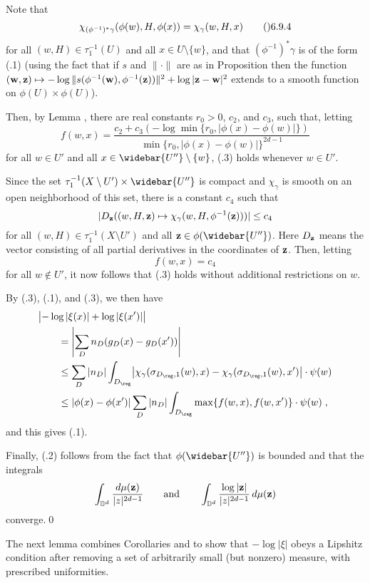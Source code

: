 Note that
$$\chi_{(\phi^{-1})^{*}\gamma}(\phi(w),H,\phi(x)) = \chi_\gamma(w,H,x)
  \tag\06.9.4$$
for all $(w,H)\in\tau_1^{-1}(U)$ and all $x\in U\setminus\{w\}$,
and that $(\phi^{-1})^{*}\gamma$ is of the form (.1) (using the fact that
if $s$ and $\|\cdot\|$ are as in Proposition  then
the function $(\bold w,\bold z) \mapsto
  -\log\|s(\phi^{-1}(\bold w),\phi^{-1}(\bold z))\|^2+\log|\bold z-\bold w|^2$
extends to a smooth function on $\phi(U)\times\phi(U)$).

Then, by Lemma , there are real constants $r_0>0$, $c_2$, and $c_3$,
such that, letting
$$f(w,x) = \frac{c_2+c_3(-\log\min\{r_0,|\phi(x)-\phi(w)|\})}
    {\min\{r_0,|\phi(x)-\phi(w)|\}^{2d-1}}$$
for all $w\in U'$ and all $x\in\widebar{U''}\setminus\{w\}$,
(.3) holds whenever $w\in U'$.

Since the set $\tau_1^{-1}(X\setminus U')\times\widebar{U''}$ is compact
and $\chi_\gamma$ is smooth on an open neighborhood of this set,
there is a constant $c_4$ such that
$$|D_{\bold z}((w,H,\bold z)\mapsto\chi_\gamma(w,H,\phi^{-1}(\bold z)))|
  \le c_4$$
for all $(w,H)\in\tau_1^{-1}(X\setminus U')$ and all
$\bold z\in\phi(\widebar{U''})$.  Here $D_{\bold z}$ means the vector
consisting of all partial derivatives in the coordinates of $\bold z$.
Then, letting
$$f(w,x) = c_4$$
for all $w\notin U'$, it now follows that (.3) holds without additional
restrictions on $w$.

By (.3), (.1), and (.3), we then have
$$\split & \bigl|-\log|\xi(x)|+\log|\xi(x')|\bigr| \\
  &\qquad= \left| \sum_D n_D(g_D(x)-g_D(x')) \right| \\
  &\qquad\le \sum_D |n_D| \int_{D_\reg}
    \bigl|\chi_\gamma(\sigma_{D_\reg,1}(w),x)
    - \chi_\gamma(\sigma_{D_\reg,1}(w),x')\bigr|\cdot\psi(w) \\
  &\qquad\le |\phi(x)-\phi(x')| \sum_D |n_D|
    \int_{D_\reg} \max\{f(w,x),f(w,x')\} \cdot \psi(w)\;,
  \endsplit$$
and this gives (.1).

Finally, (.2) follows from the fact that $\phi(\widebar{U''})$ is bounded
and that the integrals
$$\int_{\Bbb D^d} \frac{d\mu(\bold z)}{|z|^{2d-1}}
  \qquad\text{and}\qquad
  \int_{\Bbb D^d} \frac{\log|\bold z|}{|z|^{2d-1}}\,d\mu(\bold z)$$
converge.\qed
\enddemo

The next lemma combines Corollaries  and  to show that
$-\log|\xi|$ obeys a Lipshitz condition after removing a set of
arbitrarily small (but nonzero) measure, with prescribed uniformities.

